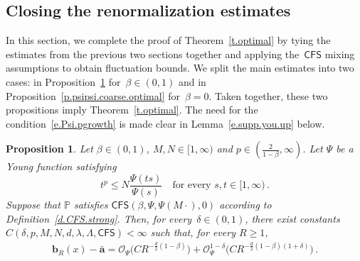 \documentclass[11pt]{article} %
\numberwithin{equation}{section}
\newtheorem{proposition}[theorem]{Proposition}
\theoremstyle{definition}
\renewcommand{\b}{\ensuremath{\mathbf{b}}}
\renewcommand{\a}{\mathbf{a}}
\newcommand{\ahom}{\bar{\a}}
\renewcommand{\P}{\mathbb{P}}
\renewcommand{\O}{\mathcal{O}}
\newcommand{\CFS}{\mathsf{CFS}}
\begin{document}
\subsection{Closing the renormalization estimates}
\label{s.fluctboot}

In this section, we complete the proof of Theorem~\ref{t.optimal} by tying the estimates from the previous two sections together and applying the~$\CFS$ mixing assumptions to obtain fluctuation bounds. 
We split the main estimates into two cases: in Proposition~\ref{p.psipsi.coarse} for~$\beta \in (0,1)$ and in Proposition~\ref{p.psipsi.coarse.optimal} for~$\beta=0$. Taken together, these two propositions imply Theorem~\ref{t.optimal}. 
The need for the condition~\eqref{e.Psi.pgrowth} is made clear in Lemma~\ref{e.supp.you.up} below. 


\begin{proposition}
\label{p.psipsi.coarse}
Let $\beta \in (0,1)$, $M, N \in [1,\infty)$ and $p \in (\frac{2}{1-\beta},\infty)$.  Let $\Psi$ be a Young function satisfying 
\begin{equation}  \label{e.Psi.pgrowth}
t^p \leq N \frac{\Psi(t s)}{\Psi(s)}  \quad \mbox{for every $s, t \in [1,\infty)$}\,. 
\end{equation}
Suppose that  $\P$ satisfies $\CFS(\beta,\Psi,\Psi(M\cdot),0)$ according to Definition~\ref{d.CFS.strong}. Then, for every~$\delta \in (0,1)$,  there exist constants $C(\delta,p,M,N,d,\lambda,\Lambda,\CFS) < \infty$ such that, for every $R \geq 1$, 
\begin{align}
\label{e.psipsi.coarse}
\b_R(x) - \ahom 
=
\O_{\Psi} \bigl( C R^{-\frac d2(1-\beta)}  \bigr) 
+ 
\O_{\Psi}^{1-\delta} \bigl( C R^{-\frac d2(1-\beta)(1+\delta)} \bigr)
\,.
\end{align}
\end{proposition}
\end{document}
